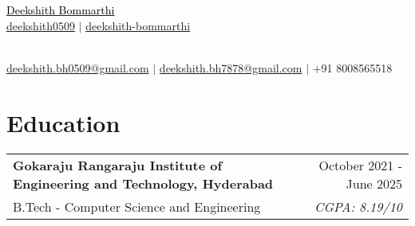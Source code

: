 \documentclass[a4paper,10pt]{article}
\newcommand{\sectionheader}[2]{%
    \begin{center}
        \textcolor{myblue}{\Huge #1} \\[6pt]
        \textcolor{mydarkblue}{\raisebox{-0.05\height}{\faGithub} \href{#2}{deekshith0509}} $|$
        \textcolor{mydarkblue}{\raisebox{-0.05\height}{\faLinkedin} \href{https://www.linkedin.com/in/deekshith-bommarthi}{deekshith-bommarthi}}
    \end{center}
}
\begin{document}
\begin{center}
    \parbox{\linewidth}{%
        \centering
        \sectionheader{\href{https://deekshith0509.github.io/Portfolio.html}{\textcolor{black}{Deekshith Bommarthi}}}{https://github.com/deekshith0509/} \\[2pt]
        \textcolor{mydarkblue}{\raisebox{-0.05\height}{\faEnvelope} \href{mailto:deekshith.bh0509@gmail.com}{deekshith.bh0509@gmail.com}} $|$
        \textcolor{mydarkblue}{\href{mailto:deekshith.bh7878@gmail.com}{deekshith.bh7878@gmail.com}} $|$
        \textcolor{mydarkblue}{\raisebox{-0.05\height}{\faMobile} +91 8008565518} \\
    }
\end{center}


\section*{Education}
\vspace{5pt}

\begin{tabularx}{\linewidth}{@{} l r @{}}
    \color{myblue} \textbf{Gokaraju Rangaraju Institute of Engineering and Technology, Hyderabad} & \hspace{3.5cm}  \color{mydarkblue} October 2021 - June 2025 \\[1pt] %
    \color{mydarkblue} B.Tech - Computer Science and Engineering &  \vspace{-10pt}\color{mylightpurple} \textit{CGPA: 8.19/10} \\[10pt] %

\end{tabularx}


\newcommand{\skillsentry}[2]{%
    \textcolor{myblue}{\textbf{#1}} & \textcolor{mydarkblue}{#2} \\
}
\newcommand{\skillsentry}[2]{%
    \textcolor{myblue}{\textbf{#1}} & \textcolor{mydarkblue}{#2} \\
}
\vspace{-3pt}
\end{document}
